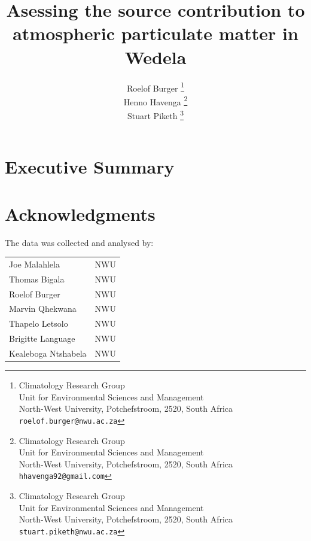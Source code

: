 \documentclass{nwureport}
\begin{document}


     \title{Asessing the source contribution to atmospheric particulate matter in Wedela}
     \author{
        Roelof Burger
          \thanks{
             Climatology Research Group\\
             Unit for Environmental Sciences and Management \\
             North-West University, Potchefstroom, 2520, South Africa \\
             {\tt roelof.burger@nwu.ac.za}} \\
        Henno Havenga
          \thanks{
             Climatology Research Group\\
             Unit for Environmental Sciences and Management \\
             North-West University, Potchefstroom, 2520, South Africa \\
             {\tt hhavenga92@gmail.com}} \\
        Stuart Piketh
          \thanks{
             Climatology Research Group\\
             Unit for Environmental Sciences and Management \\
             North-West University, Potchefstroom, 2520, South Africa \\
             {\tt stuart.piketh@nwu.ac.za}} \\
     }
     \maketitle


\chapter*{Executive Summary}

\pagebreak

\chapter*{Acknowledgments}

The data was collected and analysed by:
\\
\begin{tabular}{ l l } 
Joe Malahlela  & NWU \\
Thomas Bigala  & NWU \\
Roelof Burger  & NWU \\
Marvin Qhekwana & NWU \\
Thapelo Letsolo & NWU \\
Brigitte Language & NWU \\
Kealeboga Ntshabela & NWU \\
\end{tabular}
\end{document}
